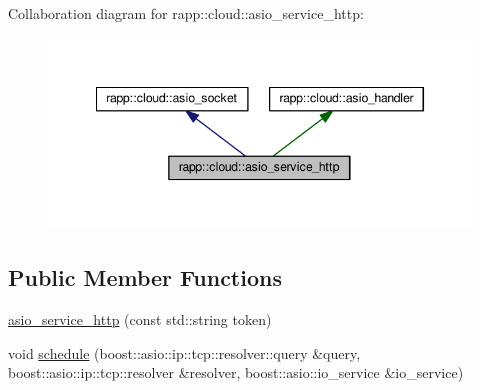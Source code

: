 Collaboration diagram for rapp\-:\-:cloud\-:\-:asio\-\_\-service\-\_\-http\-:
\nopagebreak
\begin{figure}[H]
\begin{center}
\leavevmode
\includegraphics[width=345pt]{classrapp_1_1cloud_1_1asio__service__http__coll__graph}
\end{center}
\end{figure}
\subsection*{Public Member Functions}
\begin{DoxyCompactItemize}
\item 
\hyperlink{classrapp_1_1cloud_1_1asio__service__http_accd548dd920b5265937c5af2ffebe606}{asio\-\_\-service\-\_\-http} (const std\-::string token)
\item 
void \hyperlink{classrapp_1_1cloud_1_1asio__service__http_a796f3ed98261ae22243d08056cc9e8ca}{schedule} (boost\-::asio\-::ip\-::tcp\-::resolver\-::query \&query, boost\-::asio\-::ip\-::tcp\-::resolver \&resolver, boost\-::asio\-::io\-\_\-service \&io\-\_\-service)
\end{DoxyCompactItemize}

